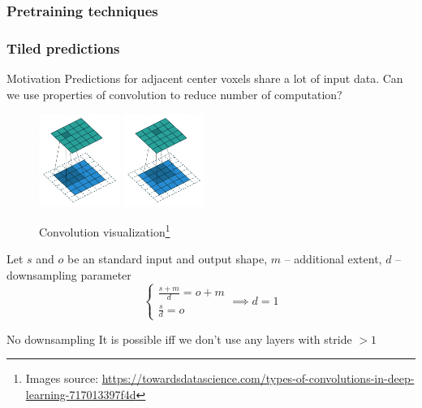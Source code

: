 \documentclass{beamer}
\begin{document}
\begin{frame}
    \frametitle{Pretraining techniques}



\end{frame}

\begin{frame}
    \frametitle{Tiled predictions}

    \begin{block}{Motivation}
        Predictions for adjacent center voxels share a lot of input data. Can we use
        properties of convolution to reduce number of computation?
    \end{block}

    \begin{minipage}{0.49\textwidth}
        \begin{figure}
            \includegraphics[height=3cm]{conv1.png}
            \includegraphics[height=3cm]{conv2.png}
            \caption{Convolution visualization\footnote{Images source: \url{https://towardsdatascience.com/types-of-convolutions-in-deep-learning-717013397f4d}}}
        \end{figure}
    \end{minipage}
    \begin{minipage}{0.49\textwidth}
        Let \( s \) and \( o \) be an standard input and output shape, \( m \) -- additional extent, \( d \) -- downsampling parameter
        \begin{equation*}
            \begin{cases}
                \frac{s + m}{d} = o + m \\
                \frac{s}{d} = o
            \end{cases}
            \implies d = 1
        \end{equation*}

        \begin{alertblock}{No downsampling}
            It is possible iff we don't use any layers with stride \( >1 \)
        \end{alertblock}
    \end{minipage}

\end{frame}
\end{document}
